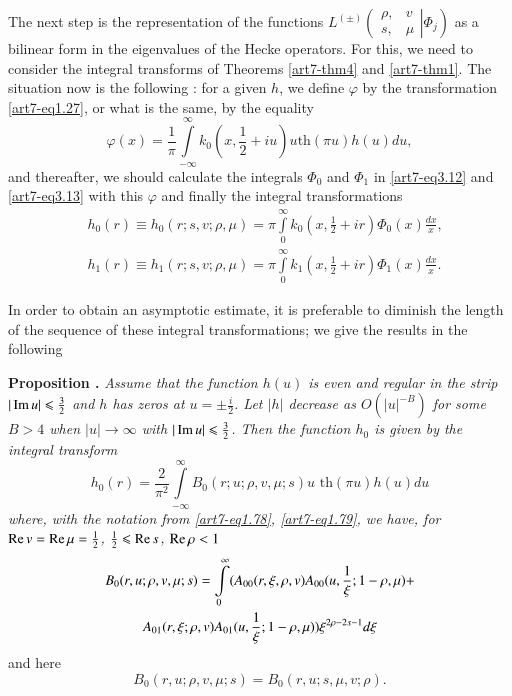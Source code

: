 The next step is the representation of the functions $L^{(\pm)} \left( 
\left. 
\begin{matrix}
\rho, & v\\
s, & \mu
\end{matrix}
\right| \Phi_j
\right)$ as a bilinear form in the eigenvalues of the Hecke operators. For this, we need to consider the integral transforms of Theorems \eqref{art7-thm4} and \eqref{art7-thm1}. The situation now is the following : for a given $h$, we define $\varphi$ by the transformation \eqref{art7-eq1.27}, or what is the same, by the equality 
\begin{equation}
\varphi(x) = \frac{1}{\pi} \int\limits^\infty_{-\infty} k_0 (x, \frac{1}{2} + iu) u \text{th} (\pi u) h (u) du,  \label{art7-eq4.4}
\end{equation}
and thereafter, we should calculate the integrals $\Phi_0$ and $\Phi_1$ in \eqref{art7-eq3.12} and \eqref{art7-eq3.13}  with this $\varphi$ and finally the integral transformations
\begin{align}
& h_0(r) \equiv h_0 (r; s , v; \rho, \mu)  = \pi \int\limits^\infty_0 k_0 (x,\frac{1}{2} + ir) \Phi_0(x) \frac{dx}{x}, \label{art7-eq4.5}\\
& h_1 (r) \equiv h_1 (r; s, v; \rho, \mu) = \pi \int\limits^\infty_0 k_1 (x, \frac{1}{2} + ir) \Phi_1 (x) \frac{dx}{x}. \label{art7-eq4.6}
\end{align}

In order to obtain an asymptotic estimate, it is preferable to diminish the length of the sequence of these integral transformations; we give the results in the following 

\medskip
\noindent
{\bfseries Proposition .\label{art7-prop7}}
\textit{Assume that the function $h(u)$ is even and regular in the strip $|\operatorname{Im} u| \leqslant \frac{3}{2}$ and $h$ has zeros at $u = \pm \frac{i}{2}$. Let $|h|$ decrease as $O(|u|^{-B})$ for some $B >4$ when $|u| \to \infty$ with $|\operatorname{Im} u| \leqslant \frac{3}{2}$. Then the function $h_0$ is given by the integral transform}
\begin{equation}
h_0(r) = \frac{2}{\pi^2} \int\limits^\infty_{-\infty} B_0 (r; u; \rho, v, \mu; s) u \text{ th} (\pi u) h(u) du \label{art7-eq4.7}
\end{equation}
\textit{where, with the notation from \eqref{art7-eq1.78}, \eqref{art7-eq1.79}, we have, for $\operatorname{Re} v = \operatorname{Re} \mu = \frac{1}{2}$, $\frac{1}{2} \leqslant \operatorname{Re} s$, $\operatorname{Re} \rho < 1 $}
\begin{gather}
B_0 (r, u; \rho, v, \mu; s) = \int\limits^\infty_0 (A_{00} (r, \xi, \rho, v) A_{00} (u, \frac{1}{\xi}; 1 - \rho, \mu) +\label{art7-eq4.8} \\
A_{01} (r, \xi; \rho, v) A_{01} (u, \frac{1}{\xi} ; 1 - \rho, \mu)) \xi^{2\rho - 2 s-1} d \xi \notag
\end{gather}\pageoriginale 
and here 
\begin{equation}
B_0 (r, u; \rho, v, \mu; s) = B_0 (r, u; s, \mu, v; \rho). \label{art7-eq4.9}
\end{equation}

